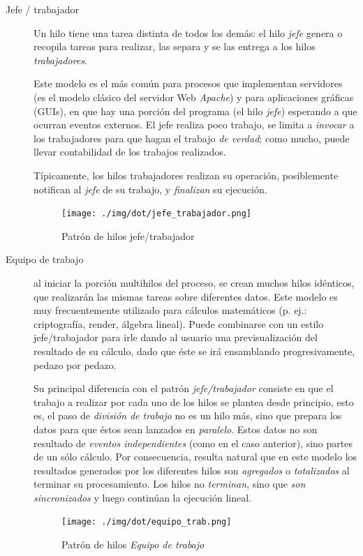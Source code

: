 \documentclass[11pt,fleqn]{book} %
\begin{document}
\begin{description}
\item[Jefe / trabajador] Un hilo tiene una tarea distinta de todos los
     demás: el hilo \emph{jefe} genera o recopila tareas para realizar, las
     separa y se las entrega a los hilos \emph{trabajadores}.

     Este modelo es el más común para procesos que implementan
     servidores (es el modelo clásico del servidor Web \emph{Apache}) y
     para aplicaciones gráficas (GUIs), en que hay una porción del
     programa (el hilo \emph{jefe}) esperando a que ocurran eventos
     externos. El jefe realiza poco trabajo, se limita a \emph{invocar} a
     los trabajadores para que hagan el trabajo \emph{de verdad}; como mucho,
     puede llevar contabilidad de los trabajos realizados.

     Típicamente, los hilos trabajadores realizan su operación, posiblemente
     notifican al \emph{jefe} de su trabajo, y \emph{finalizan} su ejecución.

     \begin{figure}[htb]
     \centering
     \texttt{[image: ./img/dot/jefe\_trabajador.png]}
     \caption{\label{PROC_jefe_trabajador}Patrón de hilos jefe/trabajador}
     \end{figure}
\end{description}


\begin{description}
\item[Equipo de trabajo] al iniciar la porción multihilos del proceso,
     se crean muchos hilos idénticos, que realizarán las mismas tareas
     sobre diferentes datos. Este modelo es muy frecuentemente
     utilizado para cálculos matemáticos (p. ej.: criptografía,
     render, álgebra lineal). Puede combinarse con un estilo jefe/trabajador para irle
     dando al usuario una previsualización del resultado de su
     cálculo, dado que éste se irá ensamblando progresivamente, pedazo
     por pedazo.

     Su principal diferencia con el patrón \emph{jefe/trabajador}
     consiste en que el trabajo a realizar por cada uno de los hilos
     se plantea desde principio, esto es, el paso de \emph{división de      trabajo} no es un hilo más, sino que prepara los datos para que
     éstos sean lanzados en \emph{paralelo}. Estos datos no son resultado de
     \emph{eventos independientes} (como en el caso anterior), sino 
     partes de un sólo cálculo. Por consecuencia, resulta natural que
     en este modelo los resultados generados por los diferentes hilos
     son \emph{agregados} o \emph{totalizados} al terminar su procesamiento. Los
     hilos no \emph{terminan}, sino que \emph{son sincronizados} y luego continúan la
     ejecución lineal.

     \begin{figure}[htb]
     \centering
     \texttt{[image: ./img/dot/equipo\_trab.png]}
     \caption{\label{PROC_equipo_trab}Patrón de hilos \emph{Equipo de trabajo}}
     \end{figure}
\end{description}
\end{document}
